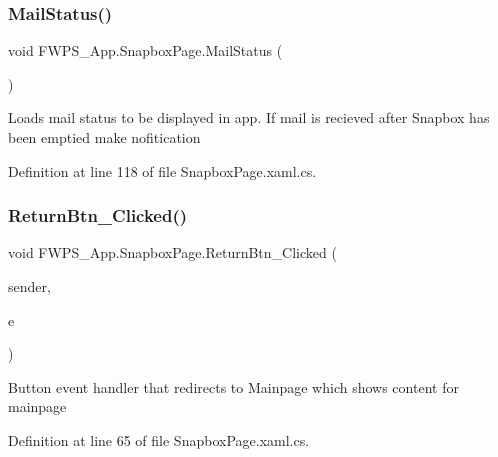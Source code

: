 \subsubsection{\texorpdfstring{Mail\+Status()}{MailStatus()}}
{\footnotesize\ttfamily void F\+W\+P\+S\+\_\+\+App.\+Snapbox\+Page.\+Mail\+Status (\begin{DoxyParamCaption}{ }\end{DoxyParamCaption})\hspace{0.3cm}{\ttfamily [private]}}

Loads mail status to be displayed in app. If mail is recieved after Snapbox has been emptied make nofitication 

Definition at line 118 of file Snapbox\+Page.\+xaml.\+cs.

\mbox{\label{class_f_w_p_s___app_1_1_snapbox_page_a0fe720ce1eeec7b8f6edf83d3294e043}} 
\subsubsection{\texorpdfstring{Return\+Btn\+\_\+\+Clicked()}{ReturnBtn\_Clicked()}}
{\footnotesize\ttfamily void F\+W\+P\+S\+\_\+\+App.\+Snapbox\+Page.\+Return\+Btn\+\_\+\+Clicked (\begin{DoxyParamCaption}\item[{object}]{sender,  }\item[{Event\+Args}]{e }\end{DoxyParamCaption})\hspace{0.3cm}{\ttfamily [private]}}

Button event handler that redirects to Mainpage which shows content for mainpage 

Definition at line 65 of file Snapbox\+Page.\+xaml.\+cs.

\mbox{\label{class_f_w_p_s___app_1_1_snapbox_page_a052ebf6dd10a214b0af721f1120bb73e}} 
